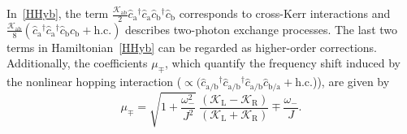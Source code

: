 \documentclass[%
reprint,
floatfix,
superscriptaddress,
amsmath,amssymb,
aps,
pra,
]{revtex4-2}
\newcommand*{\scrpt}[1]{\mathrm{#1}}
\newcommand*{\s}[1]{\ensuremath{_\scrpt{#1}}}
\begin{document}
In~\cref{HHyb}, the term $\frac{\mathcal{K}\s{ab}}{2} \hat c\s{a}^{\dagger} \hat c\s{a} \hat c\s{b}^{\dagger} \hat c\s{b}$ corresponds to cross-Kerr interactions and $\tfrac{\mathcal{K}\s{ab}}{8} \left( \hat c\s{a}^{\dagger} \hat c\s{a}^{\dagger} \hat c\s{b} \hat c\s{b} + \text{h.c.} \right)$ describes two-photon exchange processes. The last two terms in Hamiltonian~\eqref{HHyb} can be regarded as higher-order corrections. Additionally, the coefficients $\mu_{\mp}$, which quantify the frequency shift induced by the nonlinear hopping interaction ($ \propto (\hat c\s{a/b}^{\dagger} \hat c\s{a/b}^{\dagger} \hat c\s{a/b} \hat c\s{b/a} + \mathrm{h.c.} $)), are given by
%
\begin{equation}
\label{mu}
     \mu_{\mp} = \sqrt{1 + \frac{\omega_-^2}{J^2}} \: \frac{\left( \mathcal{K}\s{L} - \mathcal{K}\s{R} \right)}{\left( \mathcal{K}\s{L} + \mathcal{K}\s{R} \right)} \mp \frac{\omega_-}{J}.
\end{equation}
%

\end{document}
